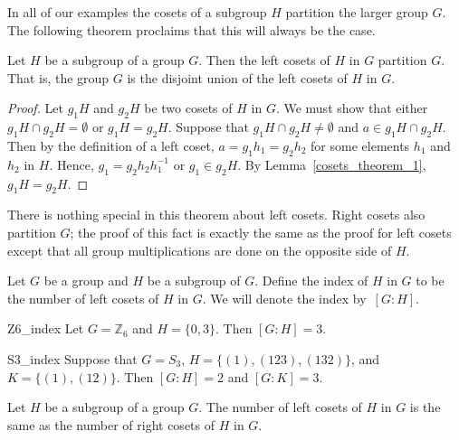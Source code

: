 In all of our  examples the cosets of a subgroup $H$ partition the larger group $G$.  The following theorem proclaims that this will always be the case. 

\begin{theorem}\label{cosets_theorem_2}
Let $H$ be a subgroup of a group $G$.  Then the left cosets of $H$ in $G$ partition $G$.  That is, the group $G$ is the disjoint union of the left cosets of $H$ in $G$. 
\end{theorem}

\begin{proof}
Let $g_1 H$ and $g_2 H$ be two cosets of $H$ in $G$.  We must show that either $g_1 H \cap g_2 H = \emptyset$ or $g_1 H = g_2 H$.  Suppose that $g_1 H \cap g_2 H \neq \emptyset$ and $a \in g_1 H \cap g_2 H$.  Then by the definition of a left coset, $a = g_1 h_1 = g_2 h_2$ for some elements $h_1$ and $h_2$ in $H$.  Hence, $g_1 = g_2 h_2 h_1^{-1}$ or $g_1 \in g_2 H$.  By Lemma~\ref{cosets_theorem_1}, $g_1 H = g_2 H$. 
\end{proof}

\medskip

There is nothing special in this theorem about left cosets.  Right cosets also partition $G$; the proof of this fact is exactly the same as the proof for left cosets except that all group multiplications are done on the opposite side of $H$. 

\medskip

Let $G$ be a group and $H$ be a subgroup of $G$.  Define the {\bfi index\/} of $H$ in $G$ to be the number of left cosets of $H$ in $G$.  We will denote the index by~$[G:H]$\label{indexofasubgroup}.  

\begin{example}{Z6_index}
Let $G= {\mathbb Z}_6$ and $H = \{ 0, 3 \}$. Then $[G:H] = 3$.
\end{example}

\begin{example}{S3_index}
Suppose that $G= S_3$, $H = \{ (1),(123), (132) \}$, and $K= \{ (1), (12) \}$.  Then $[G:H] = 2$ and $[G:K] = 3$. 
\end{example}

\begin{theorem}\label{cosets_theorem_3}
Let $H$ be a subgroup of a group $G$.  The number of left cosets of $H$ in $G$ is the same as the number of right cosets of $H$ in $G$.  
\end{theorem}

